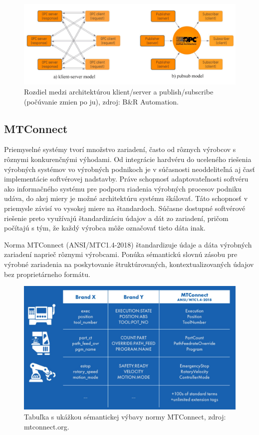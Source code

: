 \documentclass[]{tukediphc}
\begin{document}
\begin{figure}[h!]
	\centering
	\includegraphics[width=1\textwidth,angle=0]{figures/opc-ua-pubsub.jpg}
	\caption{Rozdiel medzi architektúrou klient/server a publish/subscribe (počúvanie zmien po ju), zdroj: B\&R Automation.}
\end{figure}

\subsection{MTConnect}

Priemyselné systémy tvorí množstvo zariadení, často od rôznych výrobcov s rôznymi konkurenčnými výhodami. Od integrácie hardvéru do uceleného riešenia výrobných systémov vo výrobných podnikoch je v súčasnosti neoddeliteľná aj časť implementácie softvérovej nadstavby. Práve schopnosť adaptovateľnosti softvéru ako informačného systému pre podporu riadenia výrobných procesov podniku udáva, do akej miery je možné architektúru systému škálovať. Táto schopnosť v priemysle závisí vo vysokej miere na štandardoch. Súčasne dostupné softvérové riešenie preto využívajú štandardizáciu údajov a dát zo zariadení, pričom počítajú s tým, že každý výrobca môže označovať tieto dáta inak.

Norma MTConnect (ANSI/MTC1.4-2018) štandardizuje údaje a dáta výrobných zariadení naprieč rôznymi výrobcami. Ponúka sémantickú slovnú zásobu pre výrobné zariadenia na poskytovanie štruktúrovaných, kontextualizovaných údajov bez proprietárneho formátu.

\begin{figure}[h!]
	\centering
	\includegraphics[width=.8\textwidth,angle=0]{figures/mtconnect.jpg}
	\caption{Tabuľka s ukážkou sémantickej výbavy normy MTConnect, zdroj: mtconnect.org.}
\end{figure}
\end{document}
